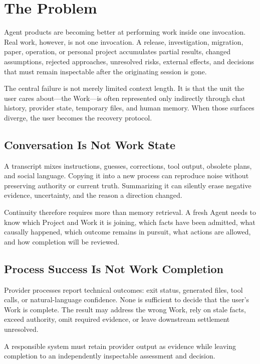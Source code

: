 \section{The Problem}

Agent products are becoming better at performing work inside one invocation.
Real work, however, is not one invocation. A release, investigation, migration,
paper, operation, or personal project accumulates partial results, changed
assumptions, rejected approaches, unresolved risks, external effects, and
decisions that must remain inspectable after the originating session is gone.

The central failure is not merely limited context length. It is that the unit
the user cares about---the Work---is often represented only indirectly through
chat history, provider state, temporary files, and human memory. When those
surfaces diverge, the user becomes the recovery protocol.

\subsection{Conversation Is Not Work State}

A transcript mixes instructions, guesses, corrections, tool output, obsolete
plans, and social language. Copying it into a new process can reproduce noise
without preserving authority or current truth. Summarizing it can silently
erase negative evidence, uncertainty, and the reason a direction changed.

Continuity therefore requires more than memory retrieval. A fresh Agent needs
to know which Project and Work it is joining, which facts have been admitted,
what causally happened, which outcome remains in pursuit, what actions are
allowed, and how completion will be reviewed.

\subsection{Process Success Is Not Work Completion}

Provider processes report technical outcomes: exit status, generated files,
tool calls, or natural-language confidence. None is sufficient to decide that
the user's Work is complete. The result may address the wrong Work, rely on
stale facts, exceed authority, omit required evidence, or leave downstream
settlement unresolved.

A responsible system must retain provider output as evidence while leaving
completion to an independently inspectable assessment and decision.

